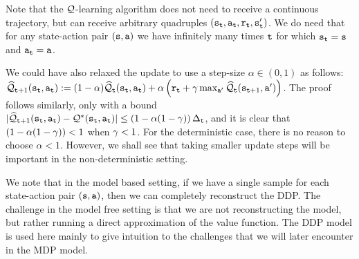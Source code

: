 \begin{remark}
Note that the $\mathcal{Q}$-learning algorithm does not need to receive a continuous trajectory, but can receive arbitrary quadruples
$({\tt s}_{\tt t},{\tt a}_{\tt t},{\tt r}_{\tt t},{\tt s}_{{\tt t}}')$. We do need that for any state-action pair $({\tt s},{\tt a})$ we have infinitely many times ${\tt t}$ for which ${\tt s}_{\tt t}={\tt s}$ and ${\tt a}_{\tt t}={\tt a}$.
\end{remark}

\begin{remark}\label{remark:modelfree_Q_learning_step}
We could have also relaxed the update to use a step-size $\alpha\in (0,1)$ as follows: $\widehat{\mathcal{Q}}_{{\tt t}+1}({\tt s}_{\tt t},{\tt a}_{\tt t}) := (1-\alpha) \widehat{\mathcal{Q}}_{{\tt t}}({\tt s}_{\tt t},{\tt a}_{\tt t}) + \alpha \left(
{\tt r}_{\tt t}+\gamma \max_{{\tt a}'}
\widehat{\mathcal{Q}}_{\tt t}({\tt s}_{{\tt t}+1},{\tt a}')\right)$. The proof follows similarly, only with a bound $| \widehat{\mathcal{Q}}_{{\tt t}+1}({\tt s}_{\tt t},{\tt a}_{\tt t})-
\mathcal{Q}^*({\tt s}_{\tt t},{\tt a}_{\tt t})| \leq \left( 1 - \alpha(1 - \gamma)\right) \Delta_{\tt t}$, and it is clear that $\left( 1 - \alpha(1 - \gamma)\right)<1$ when $\gamma<1$. For the deterministic case, there is no reason to choose $\alpha<1$. However, we shall see that taking smaller update steps will be important in the non-deterministic setting.
\end{remark}

\begin{remark}
We note that in the model based setting, if we have a single sample for each state-action pair $({\tt s},{\tt a})$, then we can completely reconstruct the DDP. The challenge in the model free setting is that we are not reconstructing the model, but rather running a direct approximation of the value function. The DDP model is used here mainly to give intuition to the challenges that we will later encounter in the MDP model.
\end{remark}

